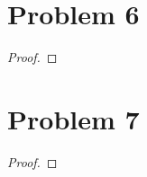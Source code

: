 \documentclass{article}
\begin{document}
\section*{Problem 6}
    \begin{proof}
        
    \end{proof}

\section*{Problem 7}
    \begin{proof}
        
    \end{proof}
\end{document}
